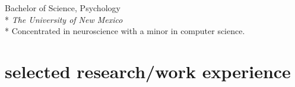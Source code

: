 \documentclass[]{friggeri-cv} %
\begin{document}
\begin{description}
  \item  {\largeheaderfont Bachelor of Science, Psychology } \hfill
    { }\\*
    {\footnotesize \emph{The University of New Mexico  }} \\*
    Concentrated in neuroscience with a minor in computer science.
\end{description}

\section{selected research/work experience}
\end{document}
